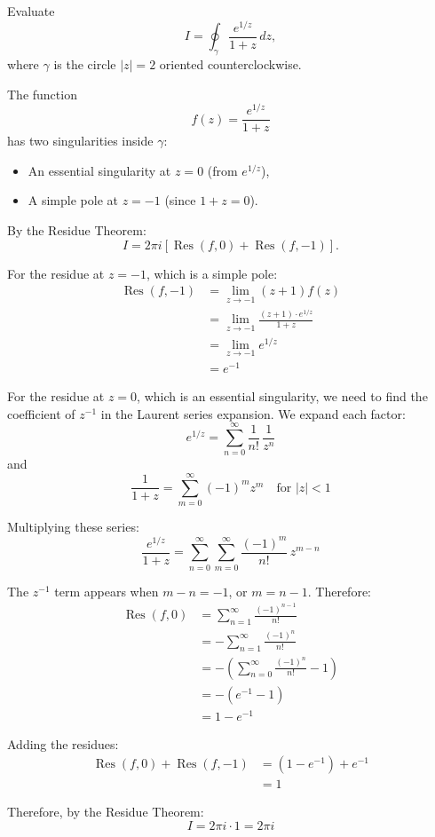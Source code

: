 \exampleline
\begin{example}
Evaluate
\[
I=\oint_{\gamma} \frac{e^{1/z}}{1+z}\,dz,
\]
where \(\gamma\) is the circle \(|z|=2\) oriented counterclockwise.

\begin{solution}
\noindent The function 
\[
f(z)=\frac{e^{1/z}}{1+z}
\]
has two singularities inside \(\gamma\):
\begin{itemize}
  \item An essential singularity at \(z=0\) (from \(e^{1/z}\)),
  \item A simple pole at \(z=-1\) (since \(1+z=0\)).
\end{itemize}

\noindent By the Residue Theorem:
\[
I=2\pi i\left[\operatorname{Res}(f,0)+\operatorname{Res}(f,-1)\right].
\]

\noindent For the residue at \(z=-1\), which is a simple pole:
\begin{align*}
\operatorname{Res}(f,-1) &= \lim_{z\to -1}(z+1)f(z) \\
&= \lim_{z\to -1} \frac{(z+1) \cdot e^{1/z}}{1+z} \\
&= \lim_{z\to -1} e^{1/z} \\
&= e^{-1}
\end{align*}

\noindent For the residue at \(z=0\), which is an essential singularity, we need to find the coefficient of \(z^{-1}\) in the Laurent series expansion. We expand each factor:
\[
e^{1/z}=\sum_{n=0}^{\infty}\frac{1}{n!}\,\frac{1}{z^n}
\]
and 
\[
\frac{1}{1+z}=\sum_{m=0}^{\infty}(-1)^m z^m \quad \text{for } |z| < 1
\]

\noindent Multiplying these series:
\[
\frac{e^{1/z}}{1+z}=\sum_{n=0}^{\infty}\sum_{m=0}^{\infty}\frac{(-1)^m}{n!}\,z^{m-n}
\]

\noindent The \(z^{-1}\) term appears when \(m-n=-1\), or \(m=n-1\). Therefore:
\begin{align*}
\operatorname{Res}(f,0) &= \sum_{n=1}^{\infty}\frac{(-1)^{n-1}}{n!} \\
&= -\sum_{n=1}^{\infty}\frac{(-1)^{n}}{n!} \\
&= -\left(\sum_{n=0}^{\infty}\frac{(-1)^{n}}{n!} - 1\right) \\
&= -\left(e^{-1} - 1\right) \\
&= 1-e^{-1}
\end{align*}

\noindent Adding the residues:
\begin{align*}
\operatorname{Res}(f,0)+\operatorname{Res}(f,-1) &= (1-e^{-1})+e^{-1} \\
&= 1
\end{align*}

\noindent Therefore, by the Residue Theorem:
\[
I=2\pi i \cdot 1 = 2\pi i
\]
\end{solution}
\end{example}
\exampleline

